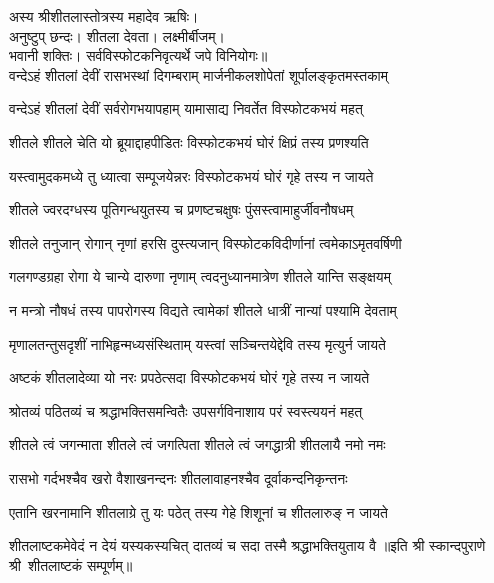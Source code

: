 
अस्य श्रीशीतलास्तोत्रस्य महादेव ऋषिः।\\
अनुष्टुप् छन्दः। शीतला देवता। लक्ष्मीर्बीजम्।\\
भवानी शक्तिः। सर्वविस्फोटकनिवृत्यर्थे जपे विनियोगः॥\\

\twolineshloka
{वन्देऽहं शीतलां देवीं रासभस्थां दिगम्बराम्}
{मार्जनीकलशोपेतां शूर्पालङ्कृतमस्तकाम्}

\twolineshloka
{वन्देऽहं शीतलां देवीं सर्वरोगभयापहाम्}
{यामासाद्य निवर्तेत विस्फोटकभयं महत्}

\twolineshloka
{शीतले शीतले चेति यो ब्रूयाद्दाहपीडितः}
{विस्फोटकभयं घोरं क्षिप्रं तस्य प्रणश्यति}

\twolineshloka
{यस्त्वामुदकमध्ये तु ध्यात्वा सम्पूजयेन्नरः}
{विस्फोटकभयं घोरं गृहे तस्य न जायते}

\twolineshloka
{शीतले ज्वरदग्धस्य पूतिगन्धयुतस्य च}
{प्रणष्टचक्षुषः पुंसस्त्वामाहुर्जीवनौषधम्}

\twolineshloka
{शीतले तनुजान् रोगान् नृणां हरसि दुस्त्यजान्}
{विस्फोटकविदीर्णानां त्वमेकाऽमृतवर्षिणी}

\twolineshloka
{गलगण्डग्रहा रोगा ये चान्ये दारुणा नृणाम्}
{त्वदनुध्यानमात्रेण शीतले यान्ति सङ्क्षयम्}

\twolineshloka
{न मन्त्रो नौषधं तस्य पापरोगस्य विद्यते}
{त्वामेकां शीतले धात्रीं नान्यां पश्यामि देवताम्}

\twolineshloka
{मृणालतन्तुसदृशीं नाभिहृन्मध्यसंस्थिताम्}
{यस्त्वां सञ्चिन्तयेद्देवि तस्य मृत्युर्न जायते}

\twolineshloka
{अष्टकं शीतलादेव्या यो नरः प्रपठेत्सदा}
{विस्फोटकभयं घोरं गृहे तस्य न जायते}

\twolineshloka
{श्रोतव्यं पठितव्यं च श्रद्धाभक्तिसमन्वितैः}
{उपसर्गविनाशाय परं स्वस्त्ययनं महत्}

\twolineshloka
{शीतले त्वं जगन्माता शीतले त्वं जगत्पिता}
{शीतले त्वं जगद्धात्री शीतलायै नमो नमः}

\twolineshloka
{रासभो गर्दभश्चैव खरो वैशाखनन्दनः}
{शीतलावाहनश्चैव दूर्वाकन्दनिकृन्तनः}

\twolineshloka
{एतानि खरनामानि शीतलाग्रे तु यः पठेत्}
{तस्य गेहे शिशूनां च शीतलारुङ् न जायते}

\twolineshloka
{शीतलाष्टकमेवेदं न देयं यस्यकस्यचित्}
{दातव्यं च सदा तस्मै श्रद्धाभक्तियुताय वै}
॥इति श्री स्कान्दपुराणे श्री~शीतलाष्टकं सम्पूर्णम्॥